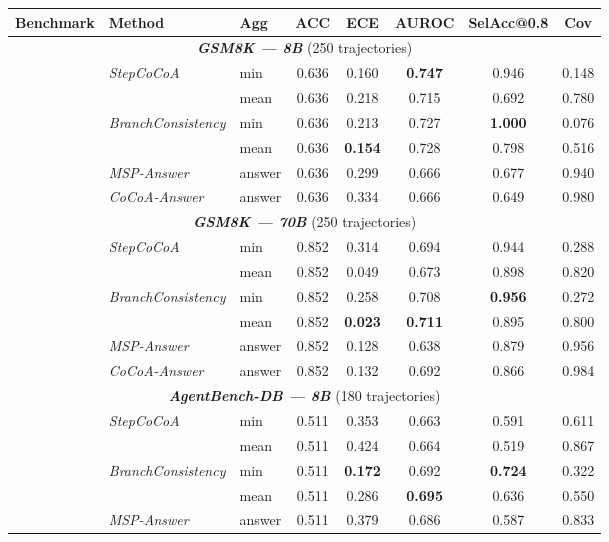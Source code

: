 \begin{table}[!h]
\centering\small
\begin{tabular}{lllccccc}
\toprule
\textbf{Benchmark} & \textbf{Method} & \textbf{Agg} & \textbf{ACC} & \textbf{ECE} & \textbf{AUROC} & \textbf{SelAcc@0.8} & \textbf{Cov} \\
\midrule
\midrule
\multicolumn{8}{c}{\textit{\textbf{GSM8K — 8B}} (250 trajectories)} \\
\midrule
 & \textit{StepCoCoA} & min & 0.636 & 0.160 & \textbf{0.747} & 0.946 & 0.148 \\
 &  & mean & 0.636 & 0.218 & 0.715 & 0.692 & 0.780 \\
 & \textit{BranchConsistency} & min & 0.636 & 0.213 & 0.727 & \textbf{1.000} & 0.076 \\
 &  & mean & 0.636 & \textbf{0.154} & 0.728 & 0.798 & 0.516 \\
 & \textit{MSP-Answer} & answer & 0.636 & 0.299 & 0.666 & 0.677 & 0.940 \\
 & \textit{CoCoA-Answer} & answer & 0.636 & 0.334 & 0.666 & 0.649 & 0.980 \\
\midrule
\multicolumn{8}{c}{\textit{\textbf{GSM8K — 70B}} (250 trajectories)} \\
\midrule
 & \textit{StepCoCoA} & min & 0.852 & 0.314 & 0.694 & 0.944 & 0.288 \\
 &  & mean & 0.852 & 0.049 & 0.673 & 0.898 & 0.820 \\
 & \textit{BranchConsistency} & min & 0.852 & 0.258 & 0.708 & \textbf{0.956} & 0.272 \\
 &  & mean & 0.852 & \textbf{0.023} & \textbf{0.711} & 0.895 & 0.800 \\
 & \textit{MSP-Answer} & answer & 0.852 & 0.128 & 0.638 & 0.879 & 0.956 \\
 & \textit{CoCoA-Answer} & answer & 0.852 & 0.132 & 0.692 & 0.866 & 0.984 \\
\midrule
\multicolumn{8}{c}{\textit{\textbf{AgentBench-DB — 8B}} (180 trajectories)} \\
\midrule
 & \textit{StepCoCoA} & min & 0.511 & 0.353 & 0.663 & 0.591 & 0.611 \\
 &  & mean & 0.511 & 0.424 & 0.664 & 0.519 & 0.867 \\
 & \textit{BranchConsistency} & min & 0.511 & \textbf{0.172} & 0.692 & \textbf{0.724} & 0.322 \\
 &  & mean & 0.511 & 0.286 & \textbf{0.695} & 0.636 & 0.550 \\
 & \textit{MSP-Answer} & answer & 0.511 & 0.379 & 0.686 & 0.587 & 0.833 \\

\end{tabular}
\end{table}
